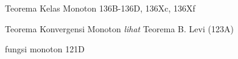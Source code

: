 




























































Teorema Kelas Monoton 136B-136D, 
136Xc, 136Xf

Teorema Konvergensi Monoton {\it lihat} Teorema B. Levi (123A)



fungsi monoton 121D






















\indexmedskip
























